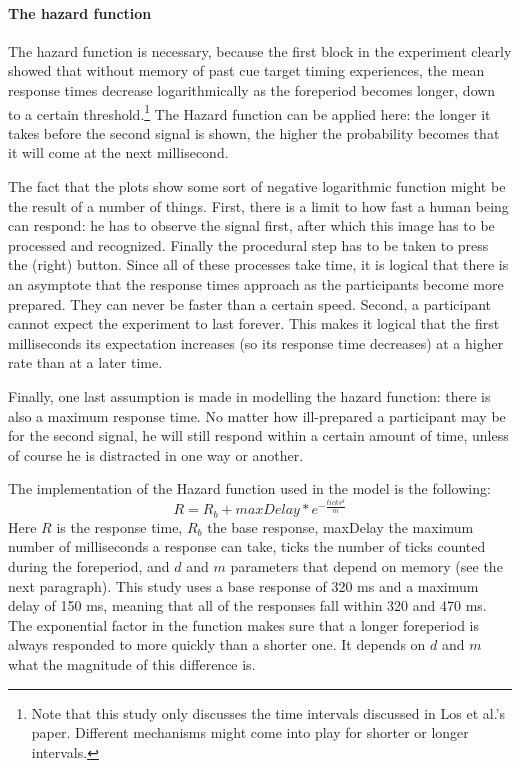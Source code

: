 \documentclass[10pt,letterpaper]{article}
\begin{document}
\paragraph{The hazard function}
The hazard function is necessary, because the first block in the experiment clearly showed that without memory of past cue target timing experiences, the mean response times decrease logarithmically as the foreperiod becomes longer, down to a certain threshold.\footnote{Note that this study only discusses the time intervals discussed in Los et al.'s paper. Different mechanisms might come into play for shorter or longer intervals.} The Hazard function can be applied here: the longer it takes before the second signal is shown, the higher the probability becomes that it will come at the next millisecond. 

The fact that the plots show some sort of negative logarithmic function might be the result of a number of things. First, there is a limit to how fast a human being can respond: he has to observe the signal first, after which this image has to be processed and recognized. Finally the procedural step has to be taken to press the (right) button. Since all of these processes take time, it is logical that there is an asymptote that the response times approach as the participants become more prepared. They can never be faster than a certain speed. Second, a participant cannot expect the experiment to last forever. This makes it logical that the first milliseconds its expectation increases (so its response time decreases) at a higher rate than at a later time. 

Finally, one last assumption is made in modelling the hazard function: there is also a maximum response time. No matter how ill-prepared a participant may be for the second signal, he will still respond within a certain amount of time, unless of course he is distracted in one way or another.

The implementation of the Hazard function used in the model is the following:
\begin{equation}
	R = R_b + maxDelay * e^{-\frac{ticks^d}{m}}
\end{equation}
Here $R$ is the response time, $R_b$ the base response, maxDelay the maximum number of milliseconds a response can take, ticks the number of ticks counted during the foreperiod, and $d$ and $m$ parameters that depend on memory (see the next paragraph). This study uses a base response of 320 ms and a maximum delay of 150 ms, meaning that all of the responses fall within 320 and 470 ms. The exponential factor in the function makes sure that a longer foreperiod is always responded to more quickly than a shorter one. It depends on $d$ and $m$ what the magnitude of this difference is.
\end{document}
